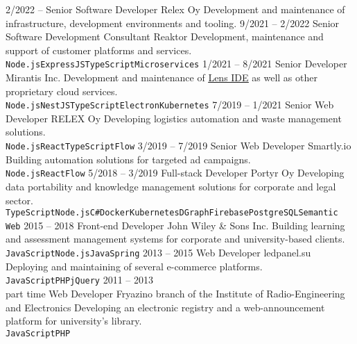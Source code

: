 \documentclass[8pt]{developercv} %
\begin{document}
\begin{entrylist}
	\entry
		{2/2022 --}
		{Senior Software Developer}
		{Relex Oy}
		{Development and maintenance of infrastructure, development environments and tooling.}
	\entry
		{9/2021 -- 2/2022}
		{Senior Software Development Consultant}
		{Reaktor}
		{Development, maintenance and support of customer platforms and services.\\ \texttt{Node.js}\slashsep\texttt{ExpressJS}\slashsep\texttt{TypeScript}\slashsep\texttt{Microservices}}
	\entry
		{1/2021 -- 8/2021}
		{Senior Developer}
		{Mirantis Inc.}
		{Development and maintenance of \href{https://github.com/lensapp/lens}{\underline{Lens IDE}} as well as other proprietary cloud services.\\ \texttt{Node.js}\slashsep\texttt{NestJS}\slashsep\texttt{TypeScript}\slashsep\texttt{Electron}\slashsep\texttt{Kubernetes}}
	\entry
		{7/2019 -- 1/2021}
		{Senior Web Developer}
		{RELEX Oy}
		{Developing logistics automation and waste management solutions.\\ \texttt{Node.js}\slashsep\texttt{React}\slashsep\texttt{TypeScript}\slashsep\texttt{Flow}}
	\entry
		{3/2019 -- 7/2019}
		{Senior Web Developer}
		{Smartly.io}
		{Building automation solutions for targeted ad campaigns.\\ \texttt{Node.js}\slashsep\texttt{React}\slashsep\texttt{Flow}}
	\entry
		{5/2018 -- 3/2019}
		{Full-stack Developer}
		{Portyr Oy}
		{Developing data portability and knowledge management solutions for corporate and legal sector.\\ \texttt{TypeScript}\slashsep\texttt{Node.js}\slashsep\texttt{C\#}\slashsep\texttt{Docker}\slashsep\texttt{Kubernetes}\slashsep\texttt{DGraph}\slashsep\texttt{Firebase}\slashsep\texttt{PostgreSQL}\slashsep\texttt{Semantic Web}}
	\entry
		{2015 -- 2018}
		{Front-end Developer}
		{John Wiley \& Sons Inc.}
		{Building learning and assessment management systems for corporate and university-based clients.\\ \texttt{JavaScript}\slashsep\texttt{Node.js}\slashsep\texttt{Java}\slashsep\texttt{Spring}}
	\entry
		{2013 -- 2015}
		{Web Developer}
		{ledpanel.su}
		{Deploying and maintaining of several e-commerce platforms.\\ \texttt{JavaScript}\slashsep\texttt{PHP}\slashsep\texttt{jQuery}}
	\entry
		{2011 -- 2013\\\footnotesize{part time}}
		{Web Developer}
		{Fryazino branch of the Institute of Radio-Engineering and Electronics}
		{Developing an electronic registry and a web-announcement platform for university's library.\\ \texttt{JavaScript}\slashsep\texttt{PHP}}
\end{entrylist}
\end{document}
